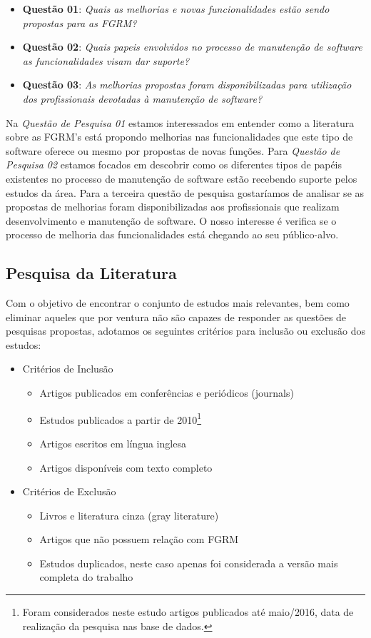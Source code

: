 \begin{itemize}
	\item \textbf{Questão 01}: \textit{Quais as melhorias e novas
			funcionalidades estão sendo propostas para as FGRM?}
   	\item \textbf{Questão 02}: \textit{Quais papeis
			envolvidos no processo de manutenção de software as funcionalidades visam
			dar suporte?}
	\item \textbf{Questão 03}: \textit{As melhorias propostas foram
			disponibilizadas para utilização dos profissionais devotadas à
			manutenção de software?}
\end{itemize}


Na \textit{Questão de Pesquisa 01} estamos interessados em entender como a
literatura sobre as FGRM's está propondo melhorias nas funcionalidades que este
tipo de software oferece ou mesmo por propostas de novas funções. Para
\textit{Questão de Pesquisa 02} estamos focados em descobrir como os diferentes
tipos de papéis existentes no processo de manutenção de software estão
recebendo suporte pelos estudos da área. Para a terceira questão de pesquisa
gostaríamos de analisar se as propostas de melhorias foram disponibilizadas aos
profissionais que realizam desenvolvimento e manutenção de software. O nosso
interesse é verifica se o processo de melhoria das funcionalidades está chegando
ao seu público-alvo.

\subsection{Pesquisa da Literatura}
\label{subsec:map-pesquisa-literatura}

Com o objetivo de encontrar o conjunto de estudos mais relevantes, bem como
eliminar aqueles que por ventura não são capazes de responder as questões de
pesquisas propostas, adotamos os seguintes critérios para inclusão ou exclusão
dos estudos:

\begin{itemize}
	\item Critérios de Inclusão
		\begin{itemize}
			\item Artigos
				publicados em conferências e periódicos (journals)
			\item Estudos
				publicados a partir de 2010\footnote{Foram considerados neste
					estudo artigos publicados até maio/2016, data de realização
					da pesquisa nas base de dados.}
			\item Artigos escritos em
				língua inglesa
			\item Artigos disponíveis com texto
				completo
		\end{itemize}
	\item Critérios de Exclusão
		\begin{itemize}
			\item Livros e literatura cinza (gray literature)
			\item Artigos que não possuem relação com FGRM
			\item Estudos duplicados, neste caso apenas foi considerada a versão mais
				completa do trabalho
		\end{itemize}
\end{itemize}

